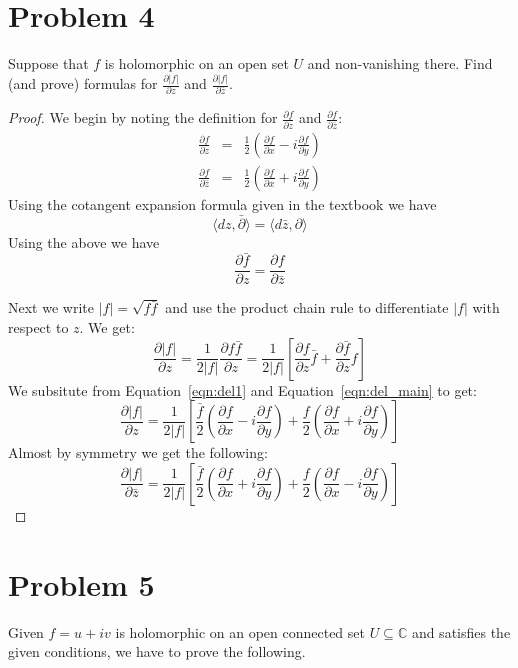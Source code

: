 \documentclass{article}[12pt]
\newtheorem{proof}{Proof}
\def\CC{\mathbb C}
\begin{document}
\section{Problem 4}
Suppose that $f$ is holomorphic on an open set $U$ and non-vanishing there.
Find (and prove) formulas for $\frac{\partial |f|}{\partial z}$ and
$\frac{\partial |f|}{\partial \bar{z}}$.
\begin{proof}
We begin by noting the definition for $\frac{\partial f}{\partial z}$
and $\frac{\partial f}{\partial \bar{z}}$:
\begin{eqnarray}
\frac{\partial f}{\partial z} & = & \frac{1}{2} 
\left(\frac{\partial f}{\partial x} -
i\frac{\partial f}{\partial y}
\right) \\ \label{eqn:del1}
\frac{\partial f}{\partial \bar{z}} & = & \frac{1}{2} 
\left(\frac{\partial f}{\partial x} +
i\frac{\partial f}{\partial y}
\right) \label{eqn:del2}
\end{eqnarray}
Using the cotangent expansion formula given in the textbook we have
\[
\langle dz,\bar{\partial} \rangle = \langle d\bar{z}, \partial \rangle
\]
Using the above we have
\begin{equation}
\frac{\partial \bar{f}}{\partial z} = \frac{\partial f}{\partial \bar{z}}
\label{eqn:del_main}
\end{equation}

Next we write $|f|=\sqrt{f\bar{f}}$ and use the product chain rule
to differentiate $|f|$ with respect to $z$. We get:
\[
\frac{\partial |f|}{\partial z} = \frac{1}{2|f|} 
\frac{\partial f\bar{f}}{\partial z} = \frac{1}{2|f|} \left[
\frac{\partial f}{\partial z}\bar{f} + \frac{\partial \bar{f}}{\partial z}f
\right]
\]
We subsitute from Equation~\ref{eqn:del1} and Equation~\ref{eqn:del_main}
to get:
\[
\frac{\partial |f|}{\partial z} = \frac{1}{2|f|} \left[
\frac{\bar{f}}{2}\left( \frac{\partial f}{\partial x} 
-i \frac{\partial f}{\partial y}\right) +
\frac{f}{2}\left( \frac{\partial f}{\partial x} +i\frac{\partial f}{\partial y}
\right)
\right]
\]
Almost by symmetry we get the following:
\[
\frac{\partial |f|}{\partial \bar{z}} = \frac{1}{2|f|} \left[
\frac{\bar{f}}{2}\left( \frac{\partial f}{\partial x} 
+i \frac{\partial f}{\partial y}\right) +
\frac{f}{2}\left( \frac{\partial f}{\partial x} -i\frac{\partial f}{\partial y}
\right)
\right]
\]

\end{proof}
\section{Problem 5}
Given $f=u+iv$ is holomorphic on an open connected set $U\subseteq \CC$ and 
satisfies the given conditions, we have to prove the following.
\end{document}
